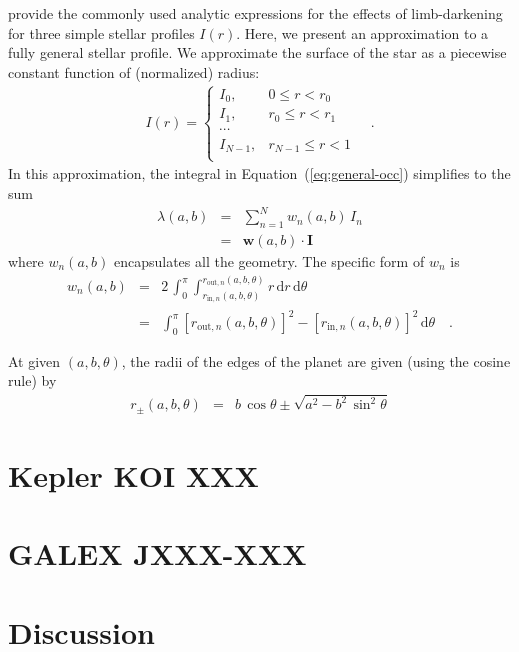 \documentclass[12pt,preprint]{aastex}
\newcommand{\Eq}[1]{Equation~(\ref{eq:#1})}
\newcommand{\eq}[1]{\Eq{#1}}
\newcommand{\dd}{\mathrm{d}}
\newcommand{\bvec}[1]{\boldsymbol{#1}}
\begin{document}
\citet{mandel} provide the commonly used analytic expressions for the effects
of limb-darkening for three simple stellar profiles $I(r)$. Here, we present
an approximation to a fully general stellar profile. We approximate the
surface of the star as a piecewise constant function of (normalized) radius:
\begin{eqnarray}
    I(r) = \left \{ \begin{array}{ll}
        I_0, & 0 \le r < r_0 \\
        I_1, & r_0 \le r < r_1 \\
        \cdots & \\
        I_{N-1}, & r_{N-1} \le r < 1 \\
    \end{array}\right . \quad.
\end{eqnarray}
In this approximation, the integral in \eq{general-occ} simplifies to the sum
\begin{eqnarray}
    \lambda(a, b) & = & \sum_{n=1}^N w_n (a, b) \, I_n \\
                  & = & \bvec{w} (a, b) \cdot \bvec{I}
\end{eqnarray}
where $w_n(a, b)$ encapsulates all the geometry. The specific form of $w_n$ is
\begin{eqnarray}
    w_n (a, b) & = & 2 \, \int_0 ^\pi \int_{r_{\mathrm{in},n} (a, b, \theta)}
        ^{r_{\mathrm{out},n} (a, b, \theta)} r \, \dd r \, \dd \theta \\
    & = & \int_0 ^\pi [ r_{\mathrm{out},n} (a, b, \theta) ]^2  -
        [ r_{\mathrm{in},n} (a, b, \theta) ]^2 \, \dd \theta
    \quad.
\end{eqnarray}

At given $(a, b, \theta)$, the radii of the edges of the planet are given
(using the cosine rule) by
\begin{eqnarray}
    r_\pm (a, b, \theta) & = & b \, \cos \theta \pm \sqrt{a^2 -
        b^2\,\sin^2\theta}
\end{eqnarray}

\section{Kepler KOI XXX}

\section{GALEX JXXX-XXX}

\section{Discussion}
\end{document}
